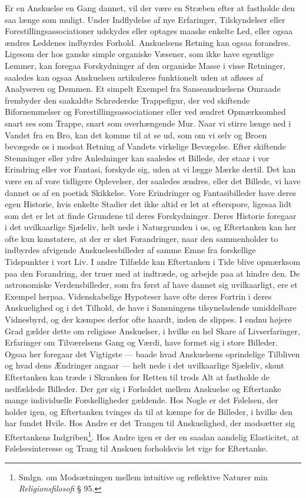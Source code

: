 \documentclass[12pt,a4paper]{book}
\newcommand{\apage}[1]{\marginnote{\footnotesize\textit{[#1]}}}
\begin{document}
Er en Anskuelse en Gang dannet, vil der være en Stræben efter at
fastholde den saa længe som muligt. Under Indflydelse af nye Erfaringer,
Tilskyndelser eller Forestillingsassociationer udskydes eller optages
maaske enkelte Led, eller ogsaa ændres Leddenes indbyrdes Forhold.
Anskuelsens Retning kan ogsaa forandres. Ligesom der hos ganske simple
organiske Væsener, som ikke have egentlige Lemmer, kan foregaa
Forskydninger af den organiske Masse i visse Retninger, saaledes kan
ogsaa Anskuelsen artikuleres funktionelt uden at afløses af Analyseren og Dømmen. Et simpelt Exempel fra Sanseanskuelsens Omraade frembyder den
saakaldte Schrøderske Trappefigur, der ved skiftende Bifornemmelser og
Forestillingsassociationer eller ved ændret Opmærksomhed snart ses som
Trappe, snart som overhængende Mur. Naar vi stirre længe ned i Vandet
fra en Bro, kan det komme til at se ud, som om vi selv og Broen bevægede
os i modsat Retning af Vandets virkelige Bevægelse. Efter skiftende
Stemninger eller ydre Anledninger kan saaledes et Billede, der staar i
vor Erindring eller vor Fantasi, forskyde sig, uden at vi lægge Mærke
dertil. Det kan være en af vore tidligere Oplevelser, der saaledes
ændres, eller det Billede, vi have dannet os af en poetisk Skikkelse.
Vore Erindringer og Fantasibilleder have deres egen Historie, \apage{54} hvis
enkelte Stadier det ikke altid er let at efterspore, ligesaa lidt som det
er let at finde Grundene til deres Forskydninger. Deres Historie foregaar
i det uvilkaarlige Sjæleliv, helt nede i Naturgrunden i os, og
Eftertanken kan her ofte kun konstatere, at der er sket Forandringer,
naar den sammenholder to indbyrdes afvigende Anskuelsesbilleder af samme
Emne fra forskellige Tidspunkter i vort Liv. I andre Tilfælde kan
Eftertanken i Tide blive opmærksom paa den Forandring, der truer med at
indtræde, og arbejde paa at hindre den. De astronomiske Verdensbilleder,
som fra først af have dannet sig uvilkaarligt, ere et Exempel herpaa.
Videnskabelige Hypoteser have ofte deres Fortrin i deres Anskuelighed og
i det Tilhold, de have i Sansningens tilsyneladende umiddelbare
Vidnesbyrd, og der kæmpes derfor ofte haardt, inden de slippes. I endnu
højere Grad gælder dette om religiøse Anskuelser, i hvilke en hel Skare
af Livserfaringer, Erfaringer om Tilværelsens Gang og Værdi, have formet
sig i store Billeder. Ogsaa her foregaar det Vigtigste --- baade hvad
Anskuelsens oprindelige Tilbliven og hvad dens Ændringer angaar --- helt
nede i det uvilkaarlige Sjæleliv, skønt Eftertanken kan træde i Skranken
for Retten til trods Alt at fastholde de nedfældede Billeder. Der gør sig
i Forholdet mellem Anskuelse og Eftertanke mange individuelle
Forskelligheder gældende. Hos Nogle er det Følelsen, der holder igen, og
Eftertanken tvinges da til at kæmpe for de Billeder, i hvilke den har
fundet Hvile. Hos Andre er det Trangen til Anskuelighed, der modsætter
sig Eftertankens Indgriben\footnote{Smlgn. om Modsætningen mellem
intuitive og reflektive Naturer min \emph{Religionsfilosofi} § 95.}. Hos
Andre igen er der en saadan aandelig Elasticitet, at Følelsesinteresse og
Trang til Anskuen forholdsvis let vige for Eftertanke.
\end{document}
